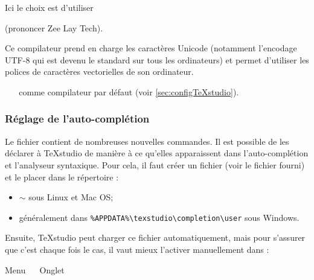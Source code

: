 Ici le choix est d'utiliser
\begin{center}
	\XeLaTeX \quad (prononcer Zee Lay Tech).
\end{center}

Ce compilateur prend en charge les caractères Unicode (notamment l'encodage UTF-8 qui est devenu le standard sur tous les ordinateurs) et permet d'utiliser les polices de caractères vectorielles de son ordinateur.

\begin{center}
	 \textrightarrow \  \textrightarrow \   comme compilateur par défaut (voir \ref{sec:configTeXstudio}).
\end{center}


\subsubsection{Réglage de l'auto-complétion}
	
Le fichier  contient de nombreuses nouvelles commandes. Il est possible de les déclarer à TeXstudio de manière à ce qu'elles apparaissent dans l'auto-complétion et l'analyseur syntaxique. Pour cela, il faut créer un fichier  (voir le fichier  fourni) et le placer dans le répertoire :
\begin{itemize}
	\item $\sim$ sous Linux et Mac OS;
	\item généralement dans \lstinline!%APPDATA%\texstudio\completion\user! sous Windows.
\end{itemize}

Ensuite, TeXstudio peut charger ce fichier  automatiquement, mais pour s'assurer que c'est chaque fois le cas, il vaut mieux l'activer manuellement dans :
\begin{center}
	Menu  \textrightarrow \  \textrightarrow \ Onglet 
\end{center}



%






